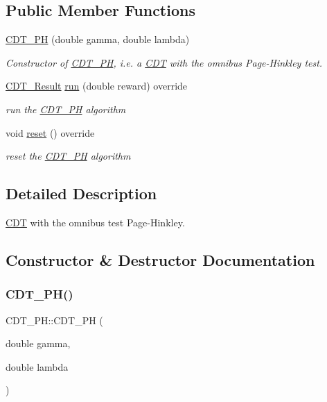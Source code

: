\subsection*{Public Member Functions}
\begin{DoxyCompactItemize}
\item 
\mbox{\hyperlink{class_c_d_t___p_h_a463a6fb9be715115dfc6b019d4788cbc}{C\+D\+T\+\_\+\+PH}} (double gamma, double lambda)
\begin{DoxyCompactList}\small\item\em Constructor of \mbox{\hyperlink{class_c_d_t___p_h}{C\+D\+T\+\_\+\+PH}}, i.\+e. a \mbox{\hyperlink{class_c_d_t}{C\+DT}} with the omnibus Page-\/\+Hinkley test. \end{DoxyCompactList}\item 
\mbox{\hyperlink{class_c_d_t___result}{C\+D\+T\+\_\+\+Result}} \mbox{\hyperlink{class_c_d_t___p_h_a58f56f0997012d0f350cc5721ef8a9e0}{run}} (double reward) override
\begin{DoxyCompactList}\small\item\em run the \mbox{\hyperlink{class_c_d_t___p_h}{C\+D\+T\+\_\+\+PH}} algorithm \end{DoxyCompactList}\item 
void \mbox{\hyperlink{class_c_d_t___p_h_adace7acacaeb66d3d2a292ccb69ac821}{reset}} () override
\begin{DoxyCompactList}\small\item\em reset the \mbox{\hyperlink{class_c_d_t___p_h}{C\+D\+T\+\_\+\+PH}} algorithm \end{DoxyCompactList}\end{DoxyCompactItemize}


\subsection{Detailed Description}
\mbox{\hyperlink{class_c_d_t}{C\+DT}} with the omnibus test Page-\/\+Hinkley. 

\subsection{Constructor \& Destructor Documentation}
\mbox{\label{class_c_d_t___p_h_a463a6fb9be715115dfc6b019d4788cbc}} 
\subsubsection{\texorpdfstring{C\+D\+T\+\_\+\+P\+H()}{CDT\_PH()}}
{\footnotesize\ttfamily C\+D\+T\+\_\+\+P\+H\+::\+C\+D\+T\+\_\+\+PH (\begin{DoxyParamCaption}\item[{double}]{gamma,  }\item[{double}]{lambda }\end{DoxyParamCaption})}



